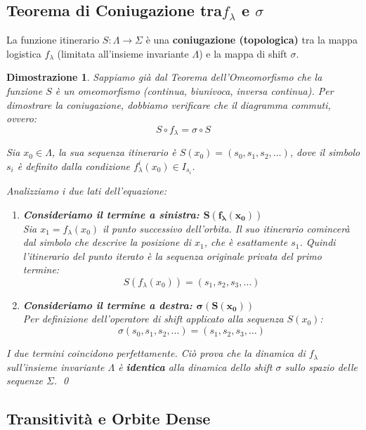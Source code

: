 \documentclass[openany]{book}
\newtheorem*{dimostrazione}{Dimostrazione}
\theoremstyle{definition}
\theoremstyle{remark}
\begin{document}
\subsection{Teorema di Coniugazione tra\texorpdfstring{$f_\lambda$ e $\sigma$}{f lambda e sigma}}

La funzione itinerario $S: \Lambda \to \Sigma$ è una \textbf{coniugazione (topologica)} tra la mappa logistica $f_\lambda$ (limitata all'insieme invariante $\Lambda$) e la mappa di shift $\sigma$.

\begin{dimostrazione}
Sappiamo già dal Teorema dell'Omeomorfismo che la funzione $S$ è un omeomorfismo (continua, biunivoca, inversa continua). Per dimostrare la coniugazione, dobbiamo verificare che il diagramma commuti, ovvero:
$$ S \circ f_\lambda = \sigma \circ S $$

Sia $x_0 \in \Lambda$, la sua sequenza itinerario è $S(x_0) = (s_0, s_1, s_2, \dots)$, dove il simbolo $s_i$ è definito dalla condizione $f_\lambda^i(x_0) \in I_{s_i}$.

Analizziamo i due lati dell'equazione:
\begin{enumerate}
    \item \textbf{Consideriamo il termine a sinistra: $\mathbf{S(f_\lambda(x_0))}$} \\
    Sia $x_1 = f_\lambda(x_0)$ il punto successivo dell'orbita. Il suo itinerario comincerà dal simbolo che descrive la posizione di $x_1$, che è esattamente $s_1$. Quindi l'itinerario del punto iterato è la sequenza originale privata del primo termine:
    $$ S(f_\lambda(x_0)) = (s_1, s_2, s_3, \dots) $$
    
    \item \textbf{Consideriamo il termine a destra: $\mathbf{\sigma(S(x_0))}$} \\
    Per definizione dell'operatore di shift applicato alla sequenza $S(x_0)$:
    $$ \sigma(s_0, s_1, s_2, \dots) = (s_1, s_2, s_3, \dots) $$
\end{enumerate}

I due termini coincidono perfettamente. Ciò prova che la dinamica di $f_\lambda$ sull'insieme invariante $\Lambda$ è \textbf{identica} alla dinamica dello shift $\sigma$ sullo spazio delle sequenze $\Sigma$. \qed
\end{dimostrazione}

\subsection{Transitività e Orbite Dense}
\end{document}
